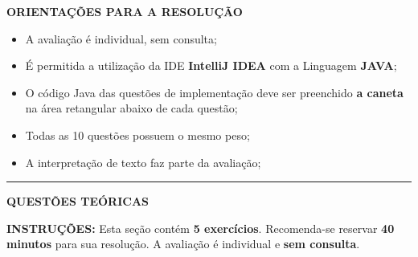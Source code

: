 \documentclass[12pt,a4paper]{article}
\begin{document}
\vspace{0.3cm}

\textbf{ORIENTAÇÕES PARA A RESOLUÇÃO}  

\begin{itemize}
    \item A avaliação é individual, sem consulta;
    \item É permitida a utilização da IDE \textbf{IntelliJ IDEA} com a Linguagem \textbf{JAVA};
    \item O código Java das questões de implementação deve ser preenchido \textbf{a caneta} na área retangular abaixo de cada questão;
    \item Todas as 10 questões possuem o mesmo peso;
    \item A interpretação de texto faz parte da avaliação;
\end{itemize}

\vspace{0.5cm}

\begin{center}
    \rule{\textwidth}{0.4pt}
    \textbf{QUESTÕES TEÓRICAS}
\end{center}

\vspace{0.2cm}

\textbf{INSTRUÇÕES:} Esta seção contém \textbf{5 exercícios}. Recomenda-se reservar \textbf{40 minutos} para sua resolução. A avaliação é individual e \textbf{sem consulta}.

\vspace{0.3cm}
\end{document}
